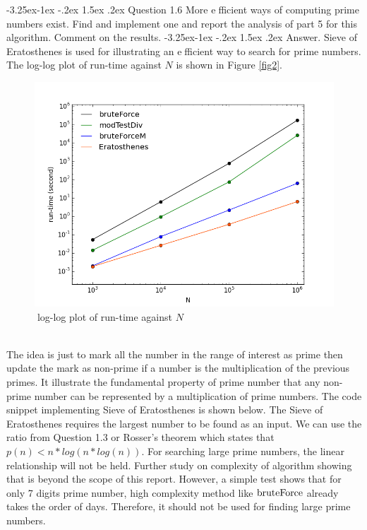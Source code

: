 \documentclass[a4paper,12pt]{article}%
\makeatletter
\renewcommand\subsection{\@startsection{subsection}{2}{\z@}%
                                     {-3.25ex\@plus -1ex \@minus -.2ex}%
                                     {1.5ex \@plus .2ex}%
                                     {\normalfont\bfseries}}
\renewcommand\subsubsection{\@startsection{subsection}{2}{\z@}%
                                     {-3.25ex\@plus -1ex \@minus -.2ex}%
                                     {1.5ex \@plus .2ex}%
                                     {\normalfont\bfseries\itshape}}%
\makeatother
\begin{document}
\subsection{Question 1.6}
More efficient ways of computing prime numbers exist. Find and implement one and report
the analysis of part 5 for this algorithm. Comment on the results.
\subsubsection{Answer.}
Sieve of Eratosthenes is used for illustrating an efficient way to search for prime numbers.
The log-log plot of run-time against $N$ is shown in Figure \eqref{fig2}.
\begin{figure}[h!]
\centering
\includegraphics[width=0.8\linewidth, height=0.5\linewidth]{rt-vs-n-eratos.png}
\caption{log-log plot of run-time against $N$}
\label{fig2}
\end{figure}\\
The idea is just to mark all the number in the range of interest as prime then update the mark as non-prime if a number is the multiplication of the previous primes. It illustrate the fundamental property of prime number that any non-prime number can be represented by a multiplication of prime numbers. The code snippet implementing Sieve of Eratosthenes is shown below. The Sieve of Eratosthenes requires the largest number to be found as an input. We can use the ratio from Question 1.3 or Rosser's theorem which states that $p(n) < n * log(n*log(n))$. For searching large prime numbers, the linear relationship will not be held. Further study on complexity of algorithm showing that is beyond the scope of this report. However, a simple test shows that for only 7 digits prime number, high complexity method like $\lstinline{bruteForce}$ already takes the order of days. Therefore, it should not be used for finding large prime numbers. 
\end{document}
